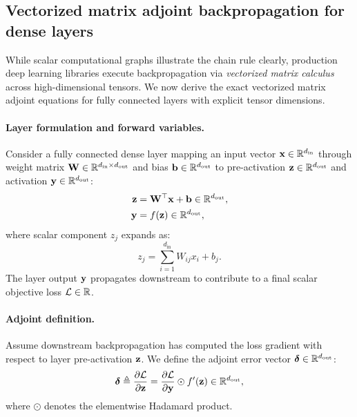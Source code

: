 \documentclass[../../main.tex]{subfiles}
\begin{document}
\subsection{Vectorized matrix adjoint backpropagation for dense layers}
\label{subsec:vectorized_backprop}

While scalar computational graphs illustrate the chain rule clearly, production deep learning libraries execute backpropagation via \emph{vectorized matrix calculus} across high-dimensional tensors. We now derive the exact vectorized matrix adjoint equations for fully connected layers with explicit tensor dimensions.

\paragraph{Layer formulation and forward variables.}
Consider a fully connected dense layer mapping an input vector $\mathbf{x} \in \mathbb{R}^{d_{\text{in}}}$ through weight matrix $\mathbf{W} \in \mathbb{R}^{d_{\text{in}} \times d_{\text{out}}}$ and bias $\mathbf{b} \in \mathbb{R}^{d_{\text{out}}}$ to pre-activation $\mathbf{z} \in \mathbb{R}^{d_{\text{out}}}$ and activation $\mathbf{y} \in \mathbb{R}^{d_{\text{out}}}$:
\begin{align}
\mathbf{z} &= \mathbf{W}^\top \mathbf{x} + \mathbf{b} \in \mathbb{R}^{d_{\text{out}}}, \label{eq:vec_fwd_z} \\
\mathbf{y} &= f(\mathbf{z}) \in \mathbb{R}^{d_{\text{out}}}, \label{eq:vec_fwd_y}
\end{align}
where scalar component $z_j$ expands as:
\begin{equation}
z_j = \sum_{i=1}^{d_{\text{in}}} W_{ij} x_i + b_j.
\end{equation}
The layer output $\mathbf{y}$ propagates downstream to contribute to a final scalar objective loss $\mathcal{L} \in \mathbb{R}$.

\paragraph{Adjoint definition.}
Assume downstream backpropagation has computed the loss gradient with respect to layer pre-activation $\mathbf{z}$. We define the adjoint error vector $\bm{\delta} \in \mathbb{R}^{d_{\text{out}}}$:
\begin{equation}
\label{eq:delta_adjoint_def}
\bm{\delta} \triangleq \frac{\partial \mathcal{L}}{\partial \mathbf{z}} = \frac{\partial \mathcal{L}}{\partial \mathbf{y}} \odot f'(\mathbf{z}) \in \mathbb{R}^{d_{\text{out}}},
\end{equation}
where $\odot$ denotes the elementwise Hadamard product.
\end{document}
